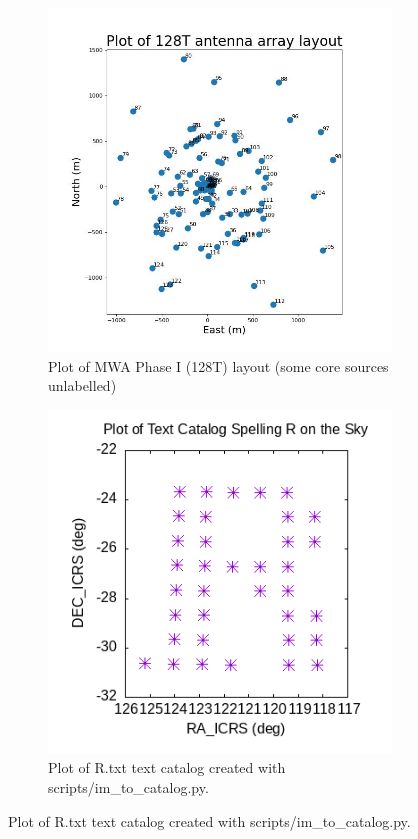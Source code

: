 \documentclass{article}
\begin{document}
\begin{figure}[t!]
\medskip
\begin{subfigure}{0.40\textwidth}
\includegraphics[width=\linewidth]{documentation_figures/rendered_txt_layout_128T.jpg}
\caption{Plot of MWA Phase I (128T) layout (some core sources unlabelled)} \label{fig:mwap1}
\end{subfigure}\hspace*{\fill}
\begin{subfigure}{0.35\textwidth}
\includegraphics[width=\linewidth]{documentation_figures/R.png}
\caption{Plot of R.txt text catalog created with scripts/im\_to\_catalog.py.} \label{fig:R}
\end{subfigure}


\end{figure}
\end{document}
